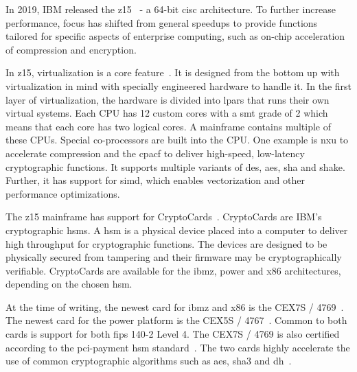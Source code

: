 In 2019, IBM released the \gls{z15}~\cite{jacobi2020} - a 64-bit \gls{cisc} architecture. To further increase performance, focus has shifted from general speedups to provide functions tailored for specific aspects of enterprise computing, such as on-chip acceleration of compression and encryption.

In \gls{z15}, virtualization is a core feature~\cite{redbook:z15}. It is designed from the bottom up with virtualization in mind with specially engineered hardware to handle it. In the first layer of virtualization, the hardware is divided into \glspl{lpar} that runs their own virtual systems. Each CPU has 12 custom cores with a \gls{smt} grade of 2 which means that each core has two logical cores. A mainframe contains multiple of these CPUs. Special co-processors are built into the CPU. One example is \gls{nxu} to accelerate compression and the \gls{cpacf} to deliver high-speed, low-latency cryptographic functions. It supports multiple variants of \gls{des}, \gls{aes}, \gls{sha} and \gls{shake}. Further, it has support for \gls{simd}, which enables vectorization and other performance optimizations.

The \gls{z15} mainframe has support for CryptoCards~\cite{ibm:hsms}. CryptoCards are IBM's cryptographic \glspl{hsm}. A \gls{hsm} is a physical device placed into a computer to deliver high throughput for cryptographic functions. The devices are designed to be physically secured from tampering and their firmware may be cryptographically verifiable. CryptoCards are available for the \gls{ibmz}, \gls{power} and \gls{x86} architectures, depending on the chosen \gls{hsm}.

At the time of writing, the newest card for \gls{ibmz} and \gls{x86} is the CEX7S / 4769~\cite{ibm:4769}. The newest card for the \gls{power} platform is the CEX5S / 4767~\cite{ibm:4767}. Common to both cards is support for both \gls{fips} 140-2 Level 4. The CEX7S / 4769 is also certified according to the \gls{pci-payment} \gls{hsm} standard~\cite{ibm:4769,ibm:4767}. The two cards highly accelerate the use of common cryptographic algorithms such as \gls{aes}, \gls{sha3} and \gls{dh}~\cite{ibm:4767,ibm:4769}.